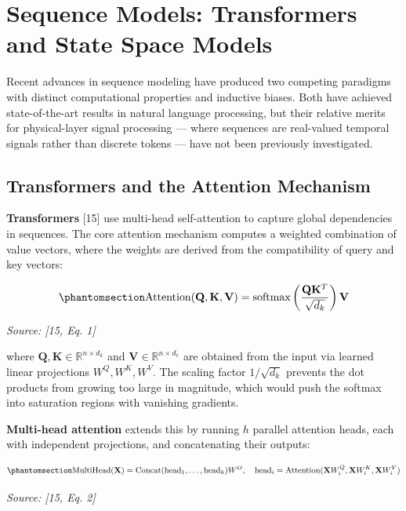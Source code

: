 \section{Sequence Models: Transformers and State Space Models}\label{sec:sequence-models-transformers-and-state-space-models}

Recent advances in sequence modeling have produced two competing paradigms with distinct computational properties and inductive biases. Both have achieved state-of-the-art results in natural language processing, but their relative merits for physical-layer signal processing --- where sequences are real-valued temporal signals rather than discrete tokens --- have not been previously investigated.

\subsection{Transformers and the Attention Mechanism}\label{sec:transformers-and-the-attention-mechanism}

\textbf{Transformers} {[}15{]} use multi-head self-attention to capture global dependencies in sequences. The core attention mechanism computes a weighted combination of value vectors, where the weights are derived from the compatibility of query and key vectors:

\begin{equation}\protect\phantomsection\label{eq:attention}{\text{Attention}(\mathbf{Q}, \mathbf{K}, \mathbf{V}) = \text{softmax}\left(\frac{\mathbf{Q}\mathbf{K}^T}{\sqrt{d_k}}\right)\mathbf{V}
}\end{equation} \par{\small\textit{Source: [15, Eq. 1]}}

where \(\mathbf{Q}, \mathbf{K} \in \mathbb{R}^{n \times d_k}\) and \(\mathbf{V} \in \mathbb{R}^{n \times d_v}\) are obtained from the input via learned linear projections \(W^Q, W^K, W^V\). The scaling factor \(1/\sqrt{d_k}\) prevents the dot products from growing too large in magnitude, which would push the softmax into saturation regions with vanishing gradients.

\textbf{Multi-head attention} extends this by running \(h\) parallel attention heads, each with independent projections, and concatenating their outputs:

\begin{equation}\protect\phantomsection\label{eq:multihead-attention}{\text{MultiHead}(\mathbf{X}) = \text{Concat}(\text{head}_1, \dots, \text{head}_h) W^O, \quad \text{head}_i = \text{Attention}(\mathbf{X} W_i^Q, \mathbf{X} W_i^K, \mathbf{X} W_i^V)
}\end{equation} \par{\small\textit{Source: [15, Eq. 2]}}

